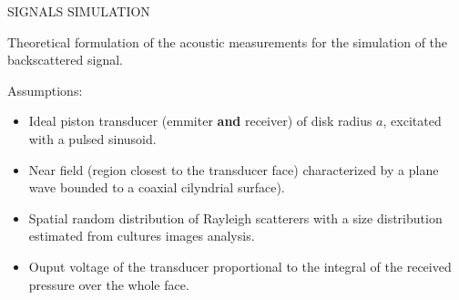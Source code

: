\documentclass[handout]{beamer}
\newcommand\Fontable{\fontsize{9}{10}\selectfont}
\begin{document}
\begin{frame}{SIGNALS SIMULATION}
\Fontable

Theoretical formulation of the acoustic measurements for the simulation of the backscattered signal.

Assumptions:
\begin{itemize}
\item Ideal piston transducer (emmiter \textbf{and} receiver) of disk radius $a$, excitated with a pulsed sinusoid.
\item Near field (region closest to the transducer face) characterized by a plane wave bounded to a coaxial cilyndrial surface).
\item Spatial random distribution of Rayleigh scatterers with a size distribution estimated from cultures images analysis.
\item Ouput voltage of the transducer proportional to the integral of the received pressure over the whole face.

\end{itemize}

\begin{center}
\end{center}

\end{frame}
\end{document}
